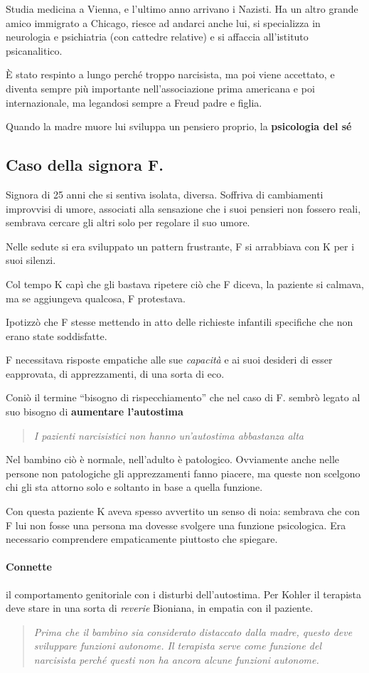 \documentclass[12pt, a4paper]{article}
\begin{document}
Studia medicina a Vienna, e l'ultimo anno arrivano i Nazisti. Ha un altro grande amico immigrato a Chicago, riesce ad andarci anche lui, si specializza in neurologia e psichiatria (con cattedre relative) e si affaccia all'istituto psicanalitico.

È stato respinto a lungo perché troppo narcisista, ma poi viene accettato, e diventa sempre più importante nell'associazione prima americana e poi internazionale, ma legandosi sempre a Freud padre e figlia.

Quando la madre muore lui sviluppa un pensiero proprio, la \textbf{psicologia del sé}

\subsection{Caso della signora F.}

Signora di 25 anni che si sentiva isolata, diversa. Soffriva di cambiamenti improvvisi di umore, associati alla sensazione che i suoi pensieri non fossero reali, sembrava cercare gli altri solo per regolare il suo umore. 

Nelle sedute si era sviluppato un pattern frustrante, F si arrabbiava con K per i suoi silenzi.

Col tempo K capì che gli bastava ripetere ciò che F diceva, la paziente si calmava, ma se aggiungeva qualcosa, F protestava.

Ipotizzò che F stesse mettendo in atto delle richieste infantili specifiche che non erano state soddisfatte. 

F necessitava risposte empatiche alle sue \emph{capacità} e ai suoi desideri di esser eapprovata, di apprezzamenti, di una sorta di eco.

Coniò il termine ``bisogno di rispecchiamento'' che nel caso di F. sembrò legato al suo bisogno di \textbf{aumentare l'autostima}

\begin{quote}
    \emph{I pazienti narcisistici non hanno un'autostima abbastanza alta}
\end{quote}
Nel bambino ciò è normale, nell'adulto è patologico.
Ovviamente anche nelle persone non patologiche gli apprezzamenti fanno piacere, ma queste non scelgono chi gli sta attorno solo e soltanto in base a quella funzione.

Con questa paziente K aveva spesso avvertito un senso di noia: sembrava che con F lui non fosse una persona ma dovesse svolgere una funzione psicologica. Era necessario comprendere empaticamente piuttosto che spiegare.

\paragraph{Connette}  il comportamento genitoriale con i disturbi dell'autostima. Per Kohler il terapista deve stare in una sorta di \emph{reverie} Bioniana, in empatia con il paziente.

\begin{quote}
    \emph{Prima che il bambino sia considerato distaccato dalla madre, que\-sto deve sviluppare funzioni autonome. Il terapista serve come funzione del narcisista perché questi non ha ancora alcune funzioni autonome.}
\end{quote}
\end{document}
